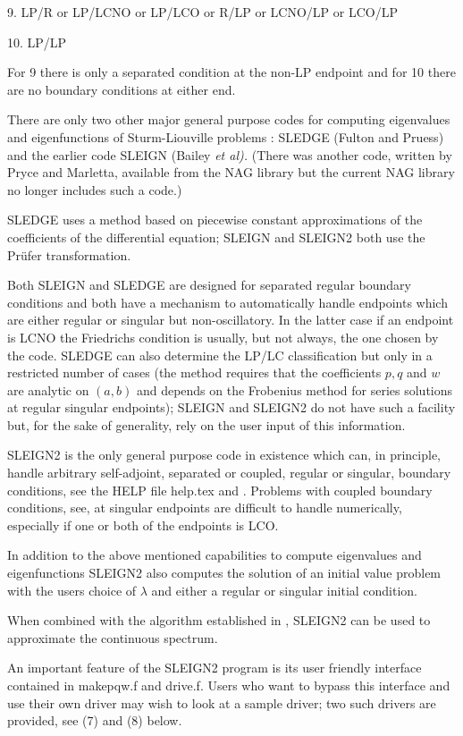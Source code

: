 \documentclass[12pt]{amsart}%
\theoremstyle{plain}
\numberwithin{equation}{section}
\numberwithin{theorem}{section}
\begin{document}
9. LP/R or LP/LCNO or LP/LCO or R/LP or LCNO/LP or LCO/LP

10. LP/LP

For 9 there is only a separated condition at the non-LP endpoint and for 10
there are no boundary conditions at either end.

There are only two other major general purpose codes for computing eigenvalues
and eigenfunctions of Sturm-Liouville problems : SLEDGE (Fulton and Pruess)
and the earlier code SLEIGN (Bailey \textit{et al).} (There was another code,
written by Pryce and Marletta, available from the NAG library but the current
NAG library no longer includes such a code.)

SLEDGE uses a method based on piecewise constant approximations of the
coefficients of the differential equation; SLEIGN and SLEIGN2 both use the
Pr\"{u}fer transformation.

Both SLEIGN and SLEDGE are designed for separated regular boundary conditions
and both have a mechanism to automatically handle endpoints which are either
regular or singular but non-oscillatory. In the latter case if an endpoint is
LCNO the Friedrichs condition is usually, but not always, the one chosen by
the code. SLEDGE can also determine the LP/LC classification but only in a
restricted number of cases (the method requires that the coefficients $p,q$
and $w$ are analytic on $(a,b)$ and depends on the Frobenius method for series
solutions at regular singular endpoints); SLEIGN and SLEIGN2 do not have such
a facility but, for the sake of generality, rely on the user input of this information.

SLEIGN2 is the only general purpose code in existence which can, in principle,
handle arbitrary self-adjoint, separated or coupled, regular or singular,
boundary conditions, see the HELP file help.tex and \cite{BEZ3}. Problems with
coupled boundary conditions, see\cite{BEZ2}, at singular endpoints are
difficult to handle numerically, especially if one or both of the endpoints is LCO.

In addition to the above mentioned capabilities to compute eigenvalues and
eigenfunctions SLEIGN2 also computes the solution of an initial value problem
with the users choice of $\lambda$ and either a regular or singular initial condition.

When combined with the algorithm established in \cite{BEWZ}, SLEIGN2 can be
used to approximate the continuous spectrum.

An important feature of the SLEIGN2 program is its user friendly interface
contained in makepqw.f and drive.f. Users who want to bypass this interface
and use their own driver may wish to look at a sample driver; two such drivers
are provided, see (7) and (8) below.
\end{document}
